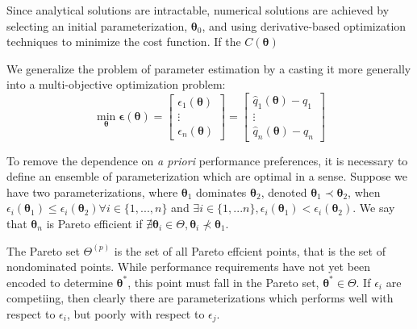 Since analytical solutions are intractable, numerical solutions are achieved by selecting an initial parameterization, $\bm{\theta}_0$, and using derivative-based optimization techniques to minimize the cost function.  If the $C(\bm{\theta})$

We generalize the problem of parameter estimation by a casting it more generally into a multi-objective optimization problem:
\begin{equation}
    \min_{\bm{\theta}} \bm{\epsilon}(\bm{\theta})
        = \begin{bmatrix}
            \epsilon_1(\bm{\theta}) \\
            \vdots \\
            \epsilon_n(\bm{\theta})
          \end{bmatrix}
        = \begin{bmatrix}
            \hat{q}_1(\bm{\theta}) - q_1 \\
            \vdots \\
            \hat{q}_n(\bm{\theta}) - q_n
          \end{bmatrix}
\end{equation}

To remove the dependence on \emph{a priori} performance preferences, it is necessary to define an ensemble of parameterization which are optimal in a sense.  Suppose we have two parameterizations, where $\bm{\theta}_1$ dominates $\bm{\theta}_2$, denoted $\bm{\theta}_1 \prec \bm{\theta}_2$, when $\epsilon_i(\bm{\theta}_1) \leq \epsilon_i(\bm{\theta}_2) \forall i \in \{1,...,n\}$ and
$\exists i \in \{1,...n\}, \epsilon_i(\bm{\theta}_1) < \epsilon_i(\bm{\theta}_2)$.
We say that $\bm{\theta}_n$ is Pareto efficient if $\nexists \bm{\theta}_i \in \Theta, \bm{\theta}_i \nprec \bm{\theta}_1$.

The Pareto set $\Theta^{(p)}$ is the set of all Pareto effcient points, that is the set of nondominated points.  While performance requirements have not yet been encoded to determine $\bm{\theta}^*$, this point must fall in the Pareto set, $\bm{\theta}^* \in \Theta$.  If $\epsilon_i$ are competiing, then clearly there are parameterizations which performs well with respect to $\epsilon_i$, but poorly with respect to $\epsilon_j$.

